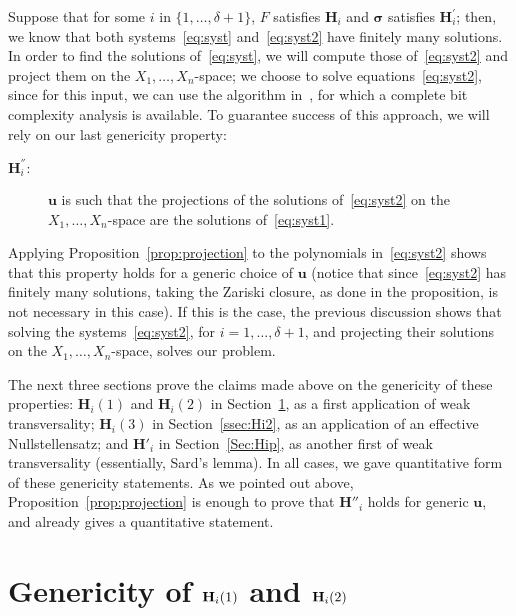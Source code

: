 \documentclass[12pt]{article}
\begin{document}
Suppose that for some $i$ in $\{1,\dots,\delta+1\}$,  $F$ satisfies
$\bm H_i$ and $\bm \sigma$ satisfies $\bm H_i^{'}$; then, we know that
both systems~\eqref{eq:syst} and~\eqref{eq:syst2} have finitely many
solutions. In order to find the solutions of~\eqref{eq:syst}, we will
compute those of~\eqref{eq:syst2} and project them on the
$X_1,\dots,X_n$-space; we choose to solve equations~\eqref{eq:syst2},
since for this input, we can use the algorithm in~\cite{SH}, for which
a complete bit complexity analysis is available. To guarantee success
of this approach, we will rely on our last genericity property:
\begin{description}
\item [$\bm H^{''}_i:$] $\bm u$ is such that the projections of the
  solutions of~\eqref{eq:syst2} on the $X_1,\dots,X_n$-space are the
  solutions of~\eqref{eq:syst1}.
\end{description}
Applying Proposition~\ref{prop:projection} to the polynomials
in~\eqref{eq:syst2} shows that this property holds for a generic
choice of $\bm u$ (notice that since~\eqref{eq:syst2} has finitely
many solutions, taking the Zariski closure, as done in the
proposition, is not necessary in this case). If this is the case, the
previous discussion shows that solving the systems~\eqref{eq:syst2},
for $i=1,\dots,\delta+1$, and projecting their solutions on the
$X_1,\dots,X_n$-space, solves our problem.

The next three sections prove the claims made above on the genericity
of these properties: $\bm H_i(1)$ and $\bm H_i(2)$ in
Section~\ref{sec:applications}, as a first application of weak
transversality; $\bm H_i(3)$ in Section~\ref{ssec:Hi2}, as an
application of an effective Nullstellensatz; and $\bm H'_i$ in
Section~\ref{Sec:Hip}, as another first of weak transversality
(essentially, Sard's lemma). In all cases, we gave quantitative form
of these genericity statements. As we pointed out above,
Proposition~\ref{prop:projection} is enough to prove that $\bm H''_i$
holds for generic $\bm u$, and already gives a quantitative statement.


\section{Genericity of ${\bf H}_i(1)$ and ${\bf H}_i(2)$}
\label{sec:applications}
\end{document}
